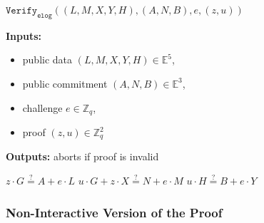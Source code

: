 \documentclass[11pt]{article}
\newenvironment{inlineAlgorithm}{}{}
\newcommand{\algoName}[1]{#1 \par}
\newcommand{\algoInputsList}[1]{
    {\small \bf Inputs:} 
        \begin{itemize}[noitemsep,topsep=0pt]
            #1
        \end{itemize}
}
\newcommand{\algoOutputs}[1]{
    {\small \bf Outputs:} #1 \par
}
\newcommand{\verify}[1]{\ensuremath{\mathtt{Verify}_{\mathtt{#1}}}}
\newcommand{\E}{\mathbb{E}}
\newcommand{\Z}{\mathbb{Z}}
\newcommand{\?}[1]{\stackrel{?}{#1}}
\begin{document}
\begin{description}
\item
\begin{inlineAlgorithm}
\algoName{$\verify{elog}((L, M, X, Y, H), (A, N, B), e, (z, u))$}
\algoInputsList{
    \item public data $(L, M, X, Y, H) \in \E^5$,
    \item public commitment $(A, N, B) \in \E^3$,
    \item challenge $e \in \Z_q$,
    \item proof $(z, u) \in \Z_q^2$
}
\algoOutputs{aborts if proof is invalid}
\begin{algorithmic}[1]
\State $z \cdot G \? = A + e \cdot L$
\State $u \cdot G + z \cdot X \? = N + e \cdot M$
\State $u \cdot H \? = B + e \cdot Y$
\end{algorithmic}
\end{inlineAlgorithm}

\end{description}

\subsubsection{Non-Interactive Version of the Proof}
\end{document}
